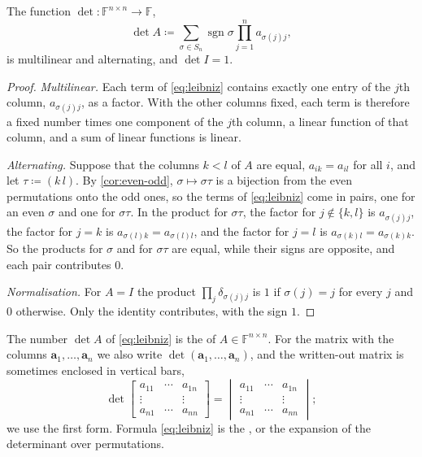 \begin{theorem}
\label{thm:det-existence}
The function $\det\colon\mathbb F^{n\times n}\to\mathbb F$,
\begin{equation}
\det A\coloneqq\sum_{\sigma\in S_n}\operatorname{sgn}\sigma\prod_{j=1}^na_{\sigma(j)j},
\label{eq:leibniz}
\end{equation}
is multilinear and alternating, and $\det I=1$.
\end{theorem}

\begin{proof}
\emph{Multilinear.} Each term of \eqref{eq:leibniz} contains exactly one entry of the $j$th column, $a_{\sigma(j)j}$, as a factor. With the other columns fixed, each term is therefore a fixed number times one component of the $j$th column, a linear function of that column, and a sum of linear functions is linear.

\emph{Alternating.} Suppose that the columns $k<l$ of $A$ are equal, $a_{ik}=a_{il}$ for all $i$, and let $\tau\coloneqq(k\,l)$. By \cref{cor:even-odd}, $\sigma\mapsto\sigma\tau$ is a bijection from the even permutations onto the odd ones, so the terms of \eqref{eq:leibniz} come in pairs, one for an even $\sigma$ and one for $\sigma\tau$. In the product for $\sigma\tau$, the factor for $j\notin\{k,l\}$ is $a_{\sigma(j)j}$, the factor for $j=k$ is $a_{\sigma(l)k}=a_{\sigma(l)l}$, and the factor for $j=l$ is $a_{\sigma(k)l}=a_{\sigma(k)k}$. So the products for $\sigma$ and for $\sigma\tau$ are equal, while their signs are opposite, and each pair contributes $0$.

\emph{Normalisation.} For $A=I$ the product $\prod_j\delta_{\sigma(j)j}$ is $1$ if $\sigma(j)=j$ for every $j$ and $0$ otherwise. Only the identity contributes, with the sign $1$.
\end{proof}

\begin{definition}[Determinant]
\label{def:determinant}
The number $\det A$ of \eqref{eq:leibniz} is the  of $A\in\mathbb F^{n\times n}$. For the matrix with the columns $\mathbf a_1,\ldots,\mathbf a_n$ we also write $\det(\mathbf a_1,\ldots,\mathbf a_n)$, and the written-out matrix is sometimes enclosed in vertical bars,
\[
\det\begin{bmatrix}a_{11}&\cdots&a_{1n}\\\vdots&&\vdots\\a_{n1}&\cdots&a_{nn}\end{bmatrix}=\begin{vmatrix}a_{11}&\cdots&a_{1n}\\\vdots&&\vdots\\a_{n1}&\cdots&a_{nn}\end{vmatrix};
\]
we use the first form. Formula \eqref{eq:leibniz} is the , or the expansion of the determinant over permutations.
\end{definition}


